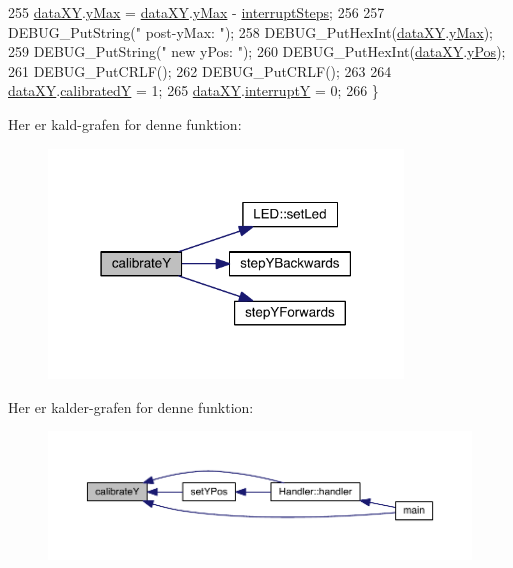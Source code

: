 \begin{DoxyCode}
255   \hyperlink{data_8h_a89d7998a721b3f36f9f4131e7a5e42d2}{dataXY}.\hyperlink{data_8h_ab979b62fb4882313ad47718325e34879}{yMax} = \hyperlink{data_8h_a89d7998a721b3f36f9f4131e7a5e42d2}{dataXY}.\hyperlink{data_8h_ab979b62fb4882313ad47718325e34879}{yMax} - \hyperlink{xy_8h_a319d8f8cbb816fc1ca2306587712b0b7}{interruptSteps};
256   
257   DEBUG\_PutString(\textcolor{stringliteral}{" post-yMax: "});
258   DEBUG\_PutHexInt(\hyperlink{data_8h_a89d7998a721b3f36f9f4131e7a5e42d2}{dataXY}.\hyperlink{data_8h_ab979b62fb4882313ad47718325e34879}{yMax});
259   DEBUG\_PutString(\textcolor{stringliteral}{" new yPos: "});
260   DEBUG\_PutHexInt(\hyperlink{data_8h_a89d7998a721b3f36f9f4131e7a5e42d2}{dataXY}.\hyperlink{data_8h_a4c7347df04ab0f3d860046571be08af4}{yPos});
261   DEBUG\_PutCRLF();
262   DEBUG\_PutCRLF();
263   
264   \hyperlink{data_8h_a89d7998a721b3f36f9f4131e7a5e42d2}{dataXY}.\hyperlink{data_8h_adebeaa27d72b604babe006a478cfed16}{calibratedY} = 1;
265   \hyperlink{data_8h_a89d7998a721b3f36f9f4131e7a5e42d2}{dataXY}.\hyperlink{data_8h_a0149ea97a32442280eb1c0b30c1eeaf1}{interruptY} = 0;
266 \}
\end{DoxyCode}


Her er kald-\/grafen for denne funktion\+:\nopagebreak
\begin{figure}[H]
\begin{center}
\leavevmode
\includegraphics[width=267pt]{db/d87/class_x_y_a86751f168bdc352fa109644298829609_cgraph}
\end{center}
\end{figure}




Her er kalder-\/grafen for denne funktion\+:\nopagebreak
\begin{figure}[H]
\begin{center}
\leavevmode
\includegraphics[width=350pt]{db/d87/class_x_y_a86751f168bdc352fa109644298829609_icgraph}
\end{center}
\end{figure}


